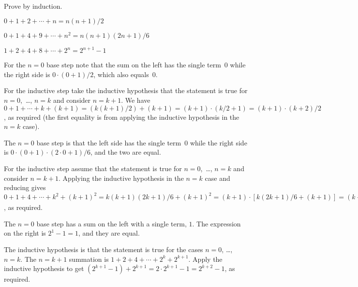 \documentclass{ibl}  %
\begin{document}
\begin{ex}
Prove by induction.
\begin{exes}
\item $0+1+2+\cdots+n=n(n+1)/2$
\item $0+1+4+9+\cdots+n^2=n(n+1)(2n+1)/6$
\item $1+2+4+8+\cdots+2^n=2^{n+1}-1$
\end{exes}
\begin{ans}
\begin{exes}
\item For the $n=0$ base step note that the sum on the left
  has the single term~$0$
  while the right side is $0\cdot(0+1)/2$, which also equals~$0$.

  For the inductive step take the inductive hypothesis 
  that the statement is true for $n=0$,~\ldots, $n=k$ and consider $n=k+1$.
  We have 
  $0+1+\cdots+k+(k+1)=(k(k+1)/2)+(k+1)=(k+1)\cdot(k/2+1)=(k+1)\cdot(k+2)/2$, 
  as required  
  (the first equality is from applying the inductive hypothesis in 
  the $n=k$ case). 
\item The $n=0$ base step is that the left side has the single term~$0$
  while the right side is $0\cdot(0+1)\cdot(2\cdot 0+1)/6$, and the 
  two are equal.

  For the inductive step assume that the statement is true for 
  $n=0$,~\ldots, $n=k$ and consider $n=k+1$.
  Applying the inductive hypothesis in the $n=k$ case and reducing gives
  $0+1+4+\cdots+k^2+(k+1)^2=k(k+1)(2k+1)/6+(k+1)^2
    =(k+1)\cdot [k(2k+1)/6+(k+1)]
    =(k+1)\cdot [k(2k+1)+6(k+1)]/6
    =(k+1)\cdot [2k^2+7k+6]/6
    =(k+1)(k+2)(2(k+1)+1)/6$,
  as required.

\item The $n=0$ base step has a sum on the left with a single term, $1$.
The expression on the right is $2^1-1=1$, and they are equal.

The inductive hypothesis is that 
the statement is true for the cases $n=0$, \ldots, $n=k$.
The $n=k+1$ summation is
$1+2+4+\cdots+2^k+2^{k+1}$. 
Apply the inductive hypothesis to get
$(2^{k+1}-1)+2^{k+1}=2\cdot 2^{k+1}-1=2^{k+2}-1$, as required. 
\end{exes}
\end{ans}
\end{ex}
\end{document}

